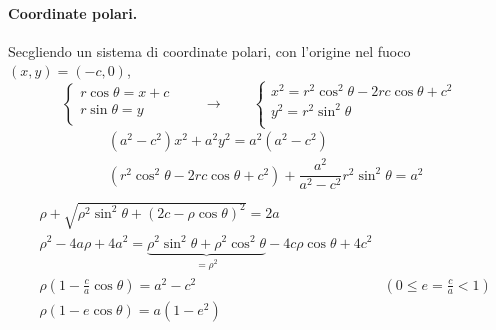 \paragraph{Coordinate polari.} Secgliendo un sistema di coordinate polari, con l'origine nel fuoco $(x,y)=(-c,0)$,
{\color{red}
\begin{equation}
\begin{cases}
    r \cos \theta = x + c \\
    r \sin \theta = y     \\
\end{cases}
\qquad \rightarrow \qquad
\begin{cases}
    x^2 = r^2 \cos^2 \theta - 2 r c \cos \theta + c^2 \\
    y^2 = r^2 \sin^2 \theta  \\
\end{cases}
\end{equation}
\begin{equation}
\begin{aligned}
    & (a^2-c^2) x^2 + a^2y^2 = a^2 (a^2-c^2) \\ 
    &  (r^2 \cos^2 \theta - 2 r c \cos \theta + c^2)  + \dfrac{a^2}{a^2-c^2} r^2 \sin^2 \theta = a^2\\ 
\end{aligned}
\end{equation}
}
\begin{equation}
\begin{aligned}
    & \rho + \sqrt{\rho^2 \sin^2 \theta + (2c-\rho \cos \theta)^2 } = 2a \\
    & \rho^2 - 4 a \rho + 4 a^2 = \underbrace{\rho^2 \sin^2 \theta  + \rho^2 \cos^2 \theta}_{= \rho^2} - 4 c \rho \cos \theta + 4c^2 \\
    & \rho \left( 1 - \frac{c}{a} \cos \theta \right) = a^2 - c^2 & \left( 0 \le e=\frac{c}{a} < 1 \right) \\
    & \rho \left( 1 - e \cos \theta \right) = a ( 1 - e^2 )
\end{aligned}
\end{equation}

